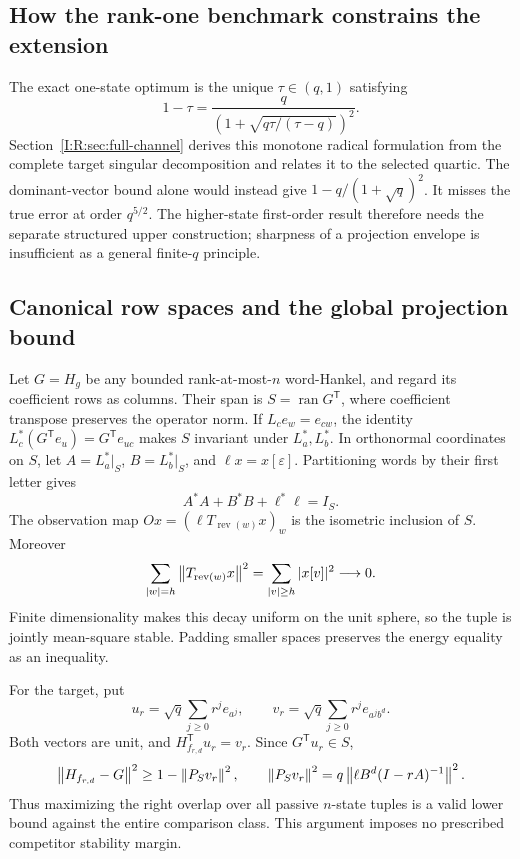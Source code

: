 \subsection{How the rank-one benchmark constrains the extension}
The exact one-state optimum is the unique $\tau\in(q,1)$ satisfying
\[
 \boxed{1-\tau=
 \frac{q}{\left(1+\sqrt{q\tau/(\tau-q)}\right)^2}.}
\]
Section~\ref{I:R:sec:full-channel} derives this monotone radical formulation
from the complete target singular decomposition and relates it to the
selected quartic. The dominant-vector bound alone would instead give
$1-q/(1+\sqrt q)^2$. It misses the true error at order $q^{5/2}$.
The higher-state first-order result therefore needs the separate
structured upper construction; sharpness of a projection envelope is
insufficient as a general finite-$q$ principle.

\subsection{Canonical row spaces and the global projection bound}
Let $G=H_g$ be any bounded rank-at-most-$n$ word-Hankel, and regard
its coefficient rows as columns. Their span is
$S=\operatorname{ran}G^{\mathsf T}$, where coefficient transpose
preserves the operator norm. If $L_c e_w=e_{cw}$, the identity
$L_c^*(G^{\mathsf T}e_u)=G^{\mathsf T}e_{uc}$ makes $S$ invariant
under $L_a^*,L_b^*$. In orthonormal coordinates on $S$, let
$A=L_a^*|_S$, $B=L_b^*|_S$, and $\ell x=x[\varepsilon]$.
Partitioning words by their first letter gives
\[
 A^*A+B^*B+\ell^*\ell=I_S.
\]
The observation map $Ox=(\ell T_{\operatorname{rev}(w)}x)_w$
is the isometric inclusion of $S$. Moreover
\[
 \sum_{|w|=h}\left\lVert T_{\operatorname{rev}(w)}x\right\rVert^2
       =\sum_{|v|\ge h}|x[v]|^2\longrightarrow0.
\]
Finite dimensionality makes this decay uniform on the unit sphere,
so the tuple is jointly mean-square stable. Padding smaller spaces
preserves the energy equality as an inequality.

For the target, put
\[
 u_r=\sqrt q\sum_{j\ge0}r^je_{a^j},\qquad
 v_r=\sqrt q\sum_{j\ge0}r^je_{a^jb^d}.
\]
Both vectors are unit, and $H_{f_{r,d}}^{\mathsf T}u_r=v_r$.
Since $G^{\mathsf T}u_r\in S$,
\[
 \left\lVert H_{f_{r,d}}-G\right\rVert^2\ge1-\left\lVert P_Sv_r\right\rVert^2,
 \qquad
 \left\lVert P_Sv_r\right\rVert^2
   =q\left\lVert\ell B^d(I-rA)^{-1}\right\rVert^2.
\]
Thus maximizing the right overlap over all passive $n$-state tuples
is a valid lower bound against the entire comparison class. This
argument imposes no prescribed competitor stability margin.



